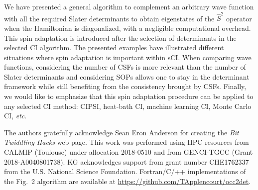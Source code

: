\documentclass[aip,jcp,reprint,showkeys]{revtex4-1}
\newcommand{\stwo}{\hat{S}^2}
\newcommand{\sop}{SOP}
\newcommand{\csf}{CSF}
\newcommand{\sci}{sCI}
\begin{document}
We have presented a general algorithm to complement an arbitrary wave function
with all the required Slater determinants to obtain eigenstates of the $\stwo$
operator when the Hamiltonian is diagonalized, with a negligible computational
overhead. This spin adaptation is introduced after the selection of
determinants in the selected CI algorithm.
The presented examples have illustrated different situations where
spin adaptation is important within {\sci}.  When comparing wave functions, considering the
number of {\csf s} is more relevant than the number of Slater determinants and
considering {\sop s} allows one to stay in the determinant framework while still
benefiting from the consistency brought by {\csf s}.
Finally, we would like to emphasize that this spin adaptation procedure can be
applied to any selected CI method: CIPSI, heat-bath CI, machine learning CI,
Monte Carlo CI, \textit{etc}.


\begin{acknowledgments}
The authors gratefully acknowledge Sean Eron Anderson for creating the 
\emph{Bit Twiddling Hacks} web page.
This work was performed using HPC resources from CALMIP (Toulouse) under
allocation 2018-0510 and from GENCI-TGCC (Grant 2018-A0040801738).
KG acknowledges support from grant number CHE1762337 from the U.S. National Science Foundation.
Fortran/C/++ implementations of the Fig.~2 algorithm are available at \url{https://github.com/TApplencourt/occ2det}. 

\end{acknowledgments}



\end{document}
